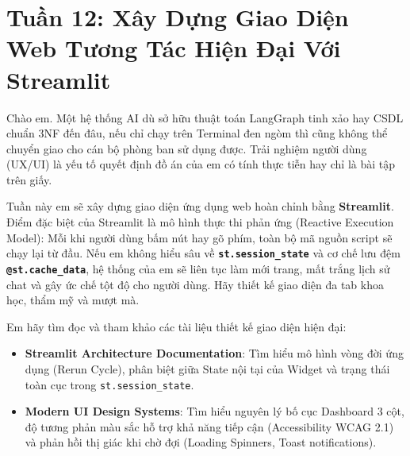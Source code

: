 ﻿\section{Tuần 12: Xây Dựng Giao Diện Web Tương Tác Hiện Đại Với Streamlit}
\label{sec:tuan_12}

\begin{advisorbox}
Chào em. Một hệ thống AI dù sở hữu thuật toán LangGraph tinh xảo hay CSDL chuẩn 3NF đến đâu, nếu chỉ chạy trên Terminal đen ngòm thì cũng không thể chuyển giao cho cán bộ phòng ban sử dụng được. Trải nghiệm người dùng (UX/UI) là yếu tố quyết định đồ án của em có tính thực tiễn hay chỉ là bài tập trên giấy.

Tuần này em sẽ xây dựng giao diện ứng dụng web hoàn chỉnh bằng \textbf{Streamlit}. Điểm đặc biệt của Streamlit là mô hình thực thi phản ứng (Reactive Execution Model): Mỗi khi người dùng bấm nút hay gõ phím, toàn bộ mã nguồn script sẽ chạy lại từ đầu. Nếu em không hiểu sâu về \textbf{\texttt{st.session\_state}} và cơ chế lưu đệm \textbf{\texttt{@st.cache\_data}}, hệ thống của em sẽ liên tục làm mới trang, mất trắng lịch sử chat và gây ức chế tột độ cho người dùng. Hãy thiết kế giao diện đa tab khoa học, thẩm mỹ và mượt mà.
\end{advisorbox}

\begin{literaturebox}
Em hãy tìm đọc và tham khảo các tài liệu thiết kế giao diện hiện đại:
\begin{itemize}[leftmargin=1.5em]
    \item \textbf{Streamlit Architecture Documentation}: Tìm hiểu mô hình vòng đời ứng dụng (Rerun Cycle), phân biệt giữa State nội tại của Widget và trạng thái toàn cục trong \texttt{st.session\_state}.
    \item \textbf{Modern UI Design Systems}: Tìm hiểu nguyên lý bố cục Dashboard 3 cột, độ tương phản màu sắc hỗ trợ khả năng tiếp cận (Accessibility WCAG 2.1) và phản hồi thị giác khi chờ đợi (Loading Spinners, Toast notifications).
\end{itemize}
\end{literaturebox}

